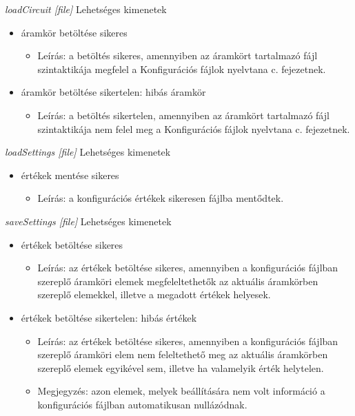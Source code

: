 \textit{loadCircuit [file]}\newline
Lehetséges kimenetek
\begin{itemize}
	\item áramkör betöltése sikeres
	\begin{itemize}
		\item Leírás: a betöltés sikeres, amennyiben az áramkört tartalmazó fájl szintaktikája megfelel a Konfigurációs fájlok nyelvtana c. fejezetnek.
	\end{itemize}
	\item áramkör betöltése sikertelen: hibás áramkör
	\begin{itemize}
		\item Leírás: a betöltés sikertelen, amennyiben az áramkört tartalmazó fájl szintaktikája nem felel meg a Konfigurációs fájlok nyelvtana c. fejezetnek.
	\end{itemize}
\end{itemize}

\textit{loadSettings [file]}\newline
Lehetséges kimenetek
\begin{itemize}
	\item értékek mentése sikeres
	\begin{itemize}
		\item Leírás: a konfigurációs értékek sikeresen fájlba mentődtek.
	\end{itemize}
\end{itemize}

\textit{saveSettings [file]}\newline
Lehetséges kimenetek
\begin{itemize}
	\item értékek betöltése sikeres
	\begin{itemize}
		\item Leírás: az értékek betöltése sikeres, amennyiben a konfigurációs fájlban szereplő áramköri elemek megfeleltethetők az aktuális áramkörben szereplő elemekkel, illetve a megadott értékek helyesek.
	\end{itemize}
	\item értékek betöltése sikertelen: hibás értékek
	\begin{itemize}
		\item Leírás: az értékek betöltése sikeres, amennyiben a konfigurációs fájlban szereplő áramköri elem nem feleltethető meg az aktuális áramkörben szereplő elemek egyikével sem, illetve ha valamelyik érték helytelen.
		\item Megjegyzés: azon elemek, melyek beállítására nem volt információ a konfigurációs fájlban automatikusan nullázódnak.
	\end{itemize}
\end{itemize}

